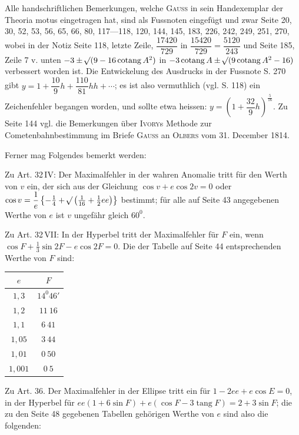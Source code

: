 Alle handschriftlichen Bemerkungen, welche \textsc{Gauss} in sein Handexemplar der
Theoria motus eingetragen hat, sind als Fussnoten eingefügt und zwar Seite 20, 30, 52,
53, 56, 65, 66, 80, 117---118, 120, 144, 145, 183, 226, 242, 249, 251, 270, wobei in der
Notiz Seite 118, letzte Zeile, $\dfrac{17420}{729}$ in $\dfrac{15420}{729} =
\dfrac{5120}{243}$ und Seite 185, Zeile 7 v. unten $-3 \pm \mathord{{}^{}\!\surd}(9-16\operatorname{cotang} A^2)$ in
$-3\operatorname{cotang} A \pm \mathord{{}^{}\!\surd}(9\operatorname{cotang} A^2-16)$ verbessert worden ist. Die Entwickelung des
Ausdrucks in der Fussnote S. 270 gibt $y = 1 + \dfrac{10}{9}h + \dfrac{110}{81}hh +
\cdots$; es ist also vermuthlich (vgl. S. 118) ein Zeichenfehler begangen worden, und
sollte etwa heissen: $y = \left(1+\dfrac{32}{9}h\right)^{\frac{5}{16}}$. Zu Seite 144
vgl. die Bemerkungen über \textsc{Ivory}s Methode zur Cometenbahnbestimmung im Briefe
\textsc{Gauss} an \textsc{Olbers} vom 31. December 1814.

Ferner mag Folgendes bemerkt werden:

Zu Art. 32\,IV: Der Maximalfehler in der wahren Anomalie tritt für den Werth von $v$ ein,
der sich aus der Gleichung $\cos v + e\cos 2v = 0$ oder $\cos v = \dfrac1e\left\{
-\tfrac14 + \mathord{{}^{}\!\surd}\left(\tfrac1{16}+\tfrac12 ee\right)\right\}$ bestimmt; für alle auf
Seite 43 angegebenen Werthe von $e$ ist $v$ ungefähr gleich $60^0$.

Zu Art. 32\,VII: In der Hyperbel tritt der Maximalfehler für $F$ ein, wenn $\cos F +
\tfrac13\sin 2F - e\cos 2F = 0$. Die der Tabelle auf Seite 44 entsprechenden Werthe von
$F$ sind:

\begin{center}
\begin{tabular}{c|c}
$e$ & $F$ \\
\hline
$1{,}3$ & $14^0 46'$ \\
$1{,}2$ & $11\ 16$ \\
$1{,}1$ & $6\ 41$ \\
$1{,}05$ & $3\ 44$ \\
$1{,}01$ & $0\ 50$ \\
$1{,}001$ & $0\ 5$ \\
\end{tabular}
\end{center}

Zu Art. 36. Der Maximalfehler in der Ellipse tritt ein für $1-2ee+e\cos E = 0$, in der
Hyperbel für $ee(1+6\sin F)+e(\cos F-3\operatorname{tang} F) = 2+3\sin F$; die zu den Seite 48
gegebenen Tabellen gehörigen Werthe von $e$ sind also die folgenden:

